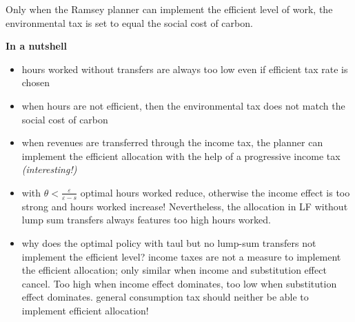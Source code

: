 Only when the Ramsey planner can implement the efficient level of work, the environmental tax is set to equal the social cost of carbon.   




\textbf{In a nutshell}
\begin{itemize}
	\item hours worked without transfers are always too low even if efficient tax rate is chosen
	\item when hours are not efficient, then the environmental tax does not match the social cost of carbon
	\item when revenues are transferred through the income tax, the planner can implement the efficient allocation with the help of a progressive income tax \textit{(interesting!)}
	\item with $\theta<\frac{\varepsilon}{\varepsilon-s}$ optimal hours worked reduce, otherwise the income effect is too strong and hours worked increase! 
	Nevertheless, the allocation in LF without lump sum transfers always features too high hours worked. 
	\item why does the optimal policy with taul but no lump-sum transfers not implement the efficient level? \ar income taxes are not a measure to implement the efficient allocation; only similar when income and substitution effect cancel. Too high when income effect dominates, too low when substitution effect dominates.
 \ar general consumption tax should neither be able to implement efficient allocation! 
\end{itemize}

